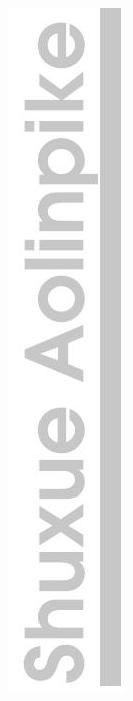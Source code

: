 \documentclass[10pt]{article}
\begin{document}
\includegraphics[max width=\textwidth, center]{2024_10_30_1bf34f7aeb61f11d11d3g-002(1)}\\
\end{document}
